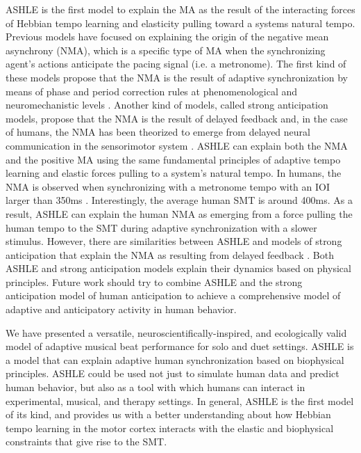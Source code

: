 \documentclass{report}
\begin{document}
ASHLE is the first model to explain the MA as the result of the interacting forces of Hebbian tempo learning and elasticity pulling toward a systems natural tempo. Previous models have focused on explaining the origin of the negative mean asynchrony (NMA), which is a specific type of MA when the synchronizing agent's actions anticipate the pacing signal (i.e. a metronome). The first kind of these models propose that the NMA is the result of adaptive synchronization by means of phase and period correction rules at phenomenological \cite{van2013adaptation} and neuromechanistic levels \cite{bose2019neuromechanistic}. Another kind of models, called strong anticipation models, propose that the NMA is the result of delayed feedback \cite{stepp2010strong} and, in the case of humans, the NMA has been theorized to emerge from delayed neural communication in the sensorimotor system \cite{roman2019delayed}. ASHLE can explain both the NMA and the positive MA using the same fundamental principles of adaptive tempo learning and elastic forces pulling to a system's natural tempo. In humans, the NMA is observed when synchronizing with a metronome tempo with an IOI larger than 350ms \cite{mates1994temporal}. Interestingly, the average human SMT is around 400ms. As a result, ASHLE can explain the human NMA as emerging from a force pulling the human tempo to the SMT during adaptive synchronization with a slower stimulus. However, there are similarities between ASHLE and models of strong anticipation that explain the NMA as resulting from delayed feedback \cite{stepp2010strong, roman2019delayed}. Both ASHLE and strong anticipation models explain their dynamics based on physical principles. Future work should try to combine ASHLE and the strong anticipation model of human anticipation to achieve a comprehensive model of adaptive and anticipatory activity in human behavior.

We have presented a versatile, neuroscientifically-inspired, and ecologically valid model of adaptive musical beat performance for solo and duet settings. ASHLE is a model that can explain adaptive human synchronization based on biophysical principles. ASHLE could be used not just to simulate human data and predict human behavior, but also as a tool with which humans can interact in experimental, musical, and therapy settings. In general, ASHLE is the first model of its kind, and provides us with a better understanding about how Hebbian tempo learning in the motor cortex interacts with the elastic and biophysical constraints that give rise to the SMT.
\end{document}
